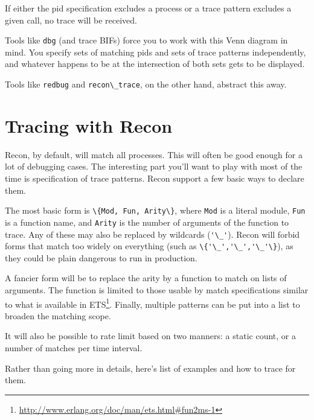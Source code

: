 \documentclass[11pt, oneside]{book}   	%
\newcommand{\otpapp}[1]{\Verb`#1`}
\newcommand{\module}[1]{\Verb`#1`}
\newcommand{\expression}[1]{\Verb`#1`}
\newcommand{\var}[1]{\Verb`#1`}
\begin{document}
If either the pid specification excludes a process or a trace pattern excludes a given call, no trace will be received.

Tools like \otpapp{dbg} (and trace BIFs) force you to work with this Venn diagram in mind. You specify sets of matching pids and sets of trace patterns independently, and whatever happens to be at the intersection of both sets gets to be displayed.

Tools like \otpapp{redbug} and \module{recon\_trace}, on the other hand, abstract this away.
\FloatBarrier

\section{Tracing with Recon}

Recon, by default, will match all processes. This will often be good enough for a lot of debugging cases. The interesting part you'll want to play with most of the time is specification of trace patterns. Recon support a few basic ways to declare them. 

The most basic form is \expression{\{Mod, Fun, Arity\}}, where \var{Mod} is a literal module, \var{Fun} is a function name, and \var{Arity} is the number of arguments of the function to trace. Any of these may also be replaced by wildcards (\expression{'\_'}). Recon will forbid forms that match too widely on everything (such as \expression{\{'\_','\_','\_'\}}), as they could be plain dangerous to run in production.

A fancier form will be to replace the arity by a function to match on lists of arguments. The function is limited to those usable by match specifications similar to what is available in ETS\footnote{\href{http://www.erlang.org/doc/man/ets.html\#fun2ms-1}{http://www.erlang.org/doc/man/ets.html\#fun2ms-1}}. Finally, multiple patterns can be put into a list to broaden the matching scope.

It will also be possible to rate limit based on two manners: a static count, or a number of matches per time interval.

Rather than going more in details, here's list of examples and how to trace for them.
\end{document}
